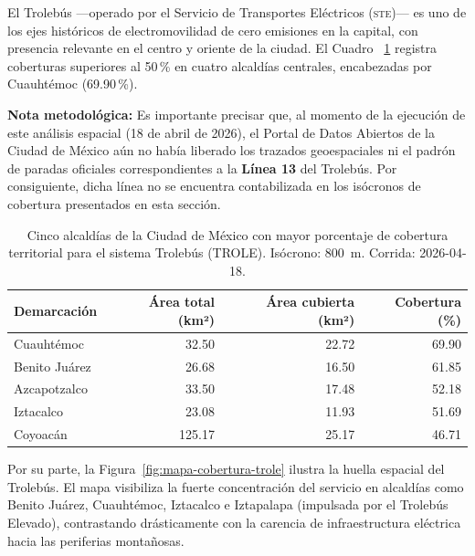El Trolebús —operado por el Servicio de Transportes Eléctricos (\textsc{ste})—
es uno de los ejes históricos de electromovilidad de cero emisiones en la
capital, con presencia relevante en el centro y oriente de la ciudad. El Cuadro~
\ref{tab:cobertura-trole-cdmx} registra coberturas superiores al 50\,\% en
cuatro alcaldías centrales, encabezadas por Cuauhtémoc (69.90\,\%).

\textbf{Nota metodológica:} Es importante precisar que, al momento de la
ejecución de este análisis espacial (18 de abril de 2026), el Portal de Datos
Abiertos de la Ciudad de México aún no había liberado los trazados geoespaciales
ni el padrón de paradas oficiales correspondientes a la \textbf{Línea 13} del
Trolebús. Por consiguiente, dicha línea no se encuentra contabilizada en los
isócronos de cobertura presentados en esta sección.

\begin{table}[H]
    \centering
    \caption[Alcaldías con mayor cobertura de Trolebús (CDMX)]{
    Cinco alcaldías de la Ciudad de México con mayor porcentaje de cobertura
    territorial para el sistema Trolebús (TROLE). Isócrono: 800~m.
    Corrida: 2026-04-18.}
    \label{tab:cobertura-trole-cdmx}
    \begin{tabular}{|l|r|r|r|}
        \hline
        \textbf{Demarcación} & \textbf{Área total (km²)} & \textbf{Área cubierta (km²)} & \textbf{Cobertura (\%)} \\
        \hline
        Cuauhtémoc    &  32.50 & 22.72 &  69.90 \\
        Benito Juárez &  26.68 & 16.50 &  61.85 \\
        Azcapotzalco  &  33.50 & 17.48 &  52.18 \\
        Iztacalco     &  23.08 & 11.93 &  51.69 \\
        Coyoacán      & 125.17 & 25.17 &  46.71 \\
        \hline
    \end{tabular}
\end{table}

Por su parte, la Figura~\ref{fig:mapa-cobertura-trole} ilustra la huella
espacial del Trolebús. El mapa visibiliza la fuerte concentración del servicio
en alcaldías como Benito Juárez, Cuauhtémoc, Iztacalco e Iztapalapa (impulsada
por el Trolebús Elevado), contrastando drásticamente con la carencia de
infraestructura eléctrica hacia las periferias montañosas.

